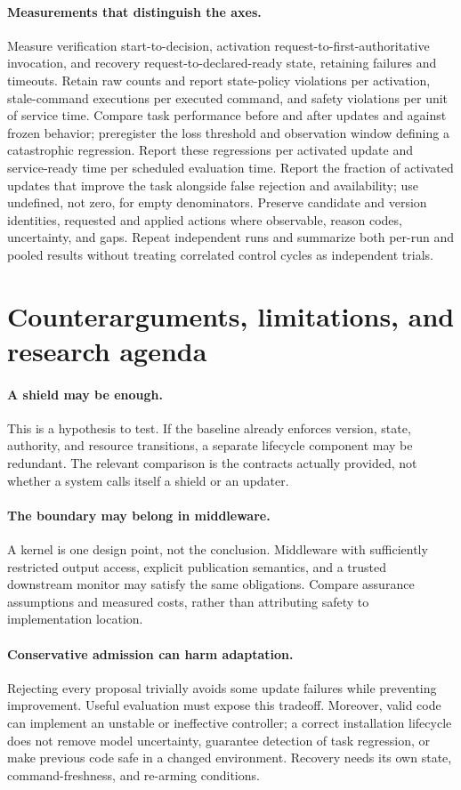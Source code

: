 \documentclass{article}
\begin{document}
\paragraph{Measurements that distinguish the axes.}
Measure verification start-to-decision, activation request-to-first-authoritative invocation, and recovery request-to-declared-ready state, retaining failures and timeouts. Retain raw counts and report state-policy violations per activation, stale-command executions per executed command, and safety violations per unit of service time. Compare task performance before and after updates and against frozen behavior; preregister the loss threshold and observation window defining a catastrophic regression. Report these regressions per activated update and service-ready time per scheduled evaluation time. Report the fraction of activated updates that improve the task alongside false rejection and availability; use undefined, not zero, for empty denominators. Preserve candidate and version identities, requested and applied actions where observable, reason codes, uncertainty, and gaps. Repeat independent runs and summarize both per-run and pooled results without treating correlated control cycles as independent trials.

\section{Counterarguments, limitations, and research agenda}
\paragraph{A shield may be enough.}
This is a hypothesis to test. If the baseline already enforces version, state, authority, and resource transitions, a separate lifecycle component may be redundant. The relevant comparison is the contracts actually provided, not whether a system calls itself a shield or an updater.

\paragraph{The boundary may belong in middleware.}
A kernel is one design point, not the conclusion. Middleware with sufficiently restricted output access, explicit publication semantics, and a trusted downstream monitor may satisfy the same obligations. Compare assurance assumptions and measured costs, rather than attributing safety to implementation location.

\paragraph{Conservative admission can harm adaptation.}
Rejecting every proposal trivially avoids some update failures while preventing improvement. Useful evaluation must expose this tradeoff. Moreover, valid code can implement an unstable or ineffective controller; a correct installation lifecycle does not remove model uncertainty, guarantee detection of task regression, or make previous code safe in a changed environment. Recovery needs its own state, command-freshness, and re-arming conditions.
\end{document}
